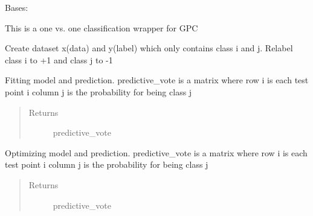 \documentclass[letterpaper,10pt,english]{sphinxmanual}
\begin{document}
\begin{fulllineitems}
\begin{fulllineitems}
\begin{quote}
\begin{description}
\end{description}\end{quote}

\end{fulllineitems}


\end{fulllineitems}


\begin{fulllineitems}
\label{pyGPs.Core:pyGPs.Core.gp.GPMC}
Bases: 

This is a one vs. one classification wrapper for GPC

\begin{fulllineitems}
\label{pyGPs.Core:pyGPs.Core.gp.GPMC.createBinaryClass}
Create dataset x(data) and y(label) which only contains class i and j.
Relabel class i to +1 and class j to -1

\end{fulllineitems}


\begin{fulllineitems}
\label{pyGPs.Core:pyGPs.Core.gp.GPMC.fitAndPredict}
Fitting model and prediction.
predictive\_vote is a matrix where
row i is each test point i
column j is the probability for being class j
\begin{quote}\begin{description}
\item[{Returns}] \leavevmode
predictive\_vote

\end{description}\end{quote}

\end{fulllineitems}


\begin{fulllineitems}
\label{pyGPs.Core:pyGPs.Core.gp.GPMC.optimizeAndPredict}
Optimizing model and prediction.
predictive\_vote is a matrix where
row i is each test point i
column j is the probability for being class j
\begin{quote}\begin{description}
\item[{Returns}] \leavevmode
predictive\_vote


\end{description}
\end{quote}
\end{fulllineitems}
\end{fulllineitems}
\end{document}
